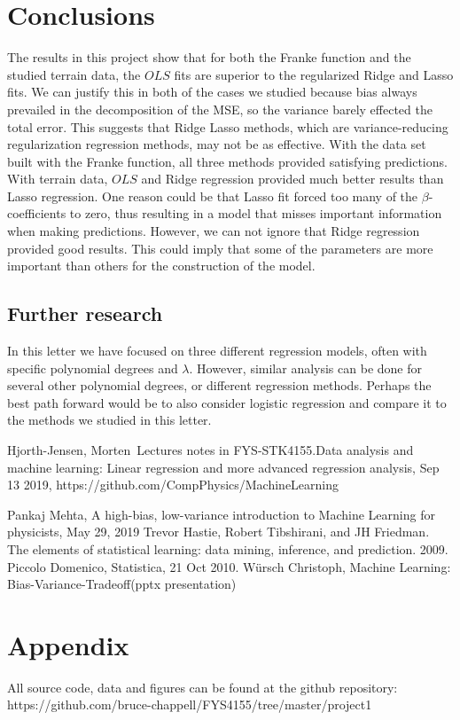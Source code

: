 \documentclass{emulateapj}
\begin{document}
\section{Conclusions}
The results in this project show that for both the Franke function and the studied terrain data, the $OLS$ fits are superior to the regularized Ridge and Lasso fits. We can justify this in both of the cases we studied because bias always prevailed in the decomposition of the MSE, so the variance barely effected the total error. 
This suggests that Ridge Lasso methods, which are variance-reducing regularization regression methods, may not be as effective.
With the data set built with the Franke function, all three methods provided satisfying predictions. With terrain data, $OLS$ and Ridge regression provided much better results than Lasso regression.
One reason could be that Lasso fit forced too many  of the $\beta$-coefficients to zero, thus resulting in a model that misses important information when making predictions. However, we can not ignore that Ridge regression provided good results. This could imply that some of the parameters are more important than others for the construction of the model. 
\subsection{Further research}
In this letter we have focused on three different regression models, often with specific polynomial degrees and $\lambda$. However, similar analysis can be done for several other polynomial degrees, or different regression methods. Perhaps the best path forward would be to also consider logistic regression and compare it to the methods we studied in this letter. 
\pagebreak

\begin{thebibliography}{}
\bibitem{} Hjorth-Jensen, Morten \,Lectures notes in FYS-STK4155.Data analysis and
machine learning: Linear regression and more advanced regression analysis,
Sep 13 2019, https://github.com/CompPhysics/MachineLearning

\bibitem {}Pankaj Mehta, A high-bias, low-variance introduction to Machine Learning for physicists, May 29, 2019
\bibitem {}Trevor Hastie, Robert Tibshirani, and JH Friedman. The elements of statistical learning: data
mining, inference, and prediction. 2009.
\bibitem{} Piccolo Domenico, Statistica, 21 Oct 2010.
\bibitem{}Würsch Christoph, Machine Learning:
\\Bias-Variance-Tradeoff(pptx presentation)
\end{thebibliography}

\section{Appendix}
All source code, data and figures can be found at the github repository: https://github.com/bruce-chappell/FYS4155/tree/master/project1
\end{document}
